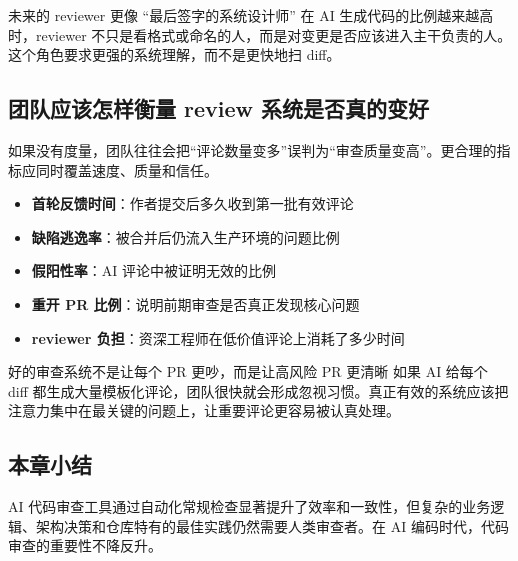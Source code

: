 \begin{importantbox}{未来的 reviewer 更像 ``最后签字的系统设计师''}
在 AI 生成代码的比例越来越高时，reviewer 不只是看格式或命名的人，而是对变更是否应该进入主干负责的人。这个角色要求更强的系统理解，而不是更快地扫 diff。
\end{importantbox}

\subsection{团队应该怎样衡量 review 系统是否真的变好}

如果没有度量，团队往往会把``评论数量变多''误判为``审查质量变高''。更合理的指标应同时覆盖速度、质量和信任。

\begin{itemize}
    \item \textbf{首轮反馈时间}：作者提交后多久收到第一批有效评论
    \item \textbf{缺陷逃逸率}：被合并后仍流入生产环境的问题比例
    \item \textbf{假阳性率}：AI 评论中被证明无效的比例
    \item \textbf{重开 PR 比例}：说明前期审查是否真正发现核心问题
    \item \textbf{reviewer 负担}：资深工程师在低价值评论上消耗了多少时间
\end{itemize}

\begin{knowledgebox}{好的审查系统不是让每个 PR 更吵，而是让高风险 PR 更清晰}
如果 AI 给每个 diff 都生成大量模板化评论，团队很快就会形成忽视习惯。真正有效的系统应该把注意力集中在最关键的问题上，让重要评论更容易被认真处理。
\end{knowledgebox}

\subsection{本章小结}

AI 代码审查工具通过自动化常规检查显著提升了效率和一致性，但复杂的业务逻辑、架构决策和仓库特有的最佳实践仍然需要人类审查者。在 AI 编码时代，代码审查的重要性不降反升。


